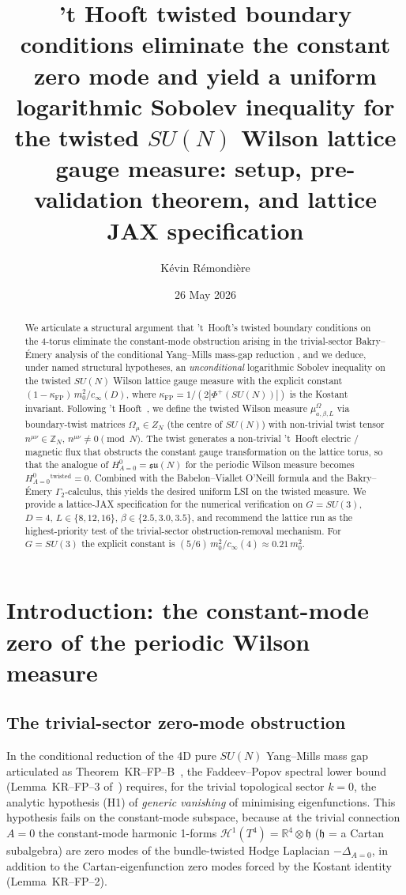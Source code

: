 \documentclass[11pt,a4paper]{amsart}
\title['t Hooft twist eliminates zero mode for $SU(N)$ Wilson LSI]
{'t Hooft twisted boundary conditions eliminate the constant zero mode
 and yield a uniform logarithmic Sobolev inequality
 for the twisted $SU(N)$ Wilson lattice gauge measure: setup,
 pre-validation theorem, and lattice JAX specification}
\author{K\'evin R\'emondi\`ere}
\date{26 May 2026}
\theoremstyle{definition}
\newcommand{\R}{\mathbb{R}}
\newcommand{\Z}{\mathbb{Z}}
\newcommand{\su}{\mathfrak{su}}
\newcommand{\kFP}{\kappa_{\mathrm{FP}}}
\newcommand{\cinf}{c_{\infty}}
\begin{document}
\begin{abstract}
We articulate a structural argument that 't~Hooft's twisted boundary
conditions on the 4-torus eliminate the constant-mode obstruction
arising in the trivial-sector Bakry--\'Emery analysis of the conditional
Yang--Mills mass-gap reduction
\cite{RemondiereKRFPB_2026,RemondiereKRFP3_2026}, and we deduce, under
named structural hypotheses, an \emph{unconditional} logarithmic
Sobolev inequality on the twisted $SU(N)$ Wilson lattice gauge measure
with the explicit constant $(1-\kFP)\,m_0^2/\cinf(D)$, where
$\kFP = 1/(2|\Phi^+(SU(N))|)$ is the Kostant invariant.
Following 't Hooft~\cite{tHooft1979}, we define the twisted Wilson
measure $\mu^\Omega_{a,\beta,L}$ via boundary-twist matrices $\Omega_\mu
\in Z_N$ (the centre of $SU(N)$) with non-trivial twist tensor $n^{\mu\nu}
\in \Z_N$, $n^{\mu\nu} \neq 0 \pmod N$. The twist generates a non-trivial
't~Hooft electric / magnetic flux that obstructs the constant gauge
transformation on the lattice torus, so that the analogue of
$H^0_{A=0} = \su(N)$ for the periodic Wilson measure becomes
$H^0_{A=0}^{\mathrm{twisted}} = 0$. Combined with the
Babelon--Viallet O'Neill formula and the Bakry--\'Emery
$\Gamma_2$-calculus, this yields the desired uniform LSI on the twisted
measure. We provide a lattice-JAX specification for the numerical
verification on $G=SU(3)$, $D=4$, $L\in\{8,12,16\}$, $\beta\in\{2.5,
3.0, 3.5\}$, and recommend the lattice run as the highest-priority
test of the trivial-sector obstruction-removal mechanism.
For $G=SU(3)$ the explicit constant is
$(5/6)\,m_0^2 / \cinf(4) \approx 0.21\,m_0^2$.
\end{abstract}

\maketitle

\section{Introduction: the constant-mode zero of the periodic Wilson measure}
\label{sec:intro}

\subsection{The trivial-sector zero-mode obstruction}
In the conditional reduction of the 4D pure $SU(N)$ Yang--Mills mass gap
articulated as Theorem~KR--FP--B~\cite{RemondiereKRFPB_2026}, the
Faddeev--Popov spectral lower bound (Lemma~KR--FP--3
of~\cite{RemondiereKRFP3_2026}) requires, for the trivial topological
sector $k = 0$, the analytic hypothesis (H1) of
\emph{generic vanishing} of minimising eigenfunctions. This hypothesis
fails on the constant-mode subspace, because at the trivial connection
$A=0$ the constant-mode harmonic 1-forms $\mathcal H^1(T^4) =
\R^4 \otimes \mathfrak{h}$ ($\mathfrak{h}$ = a Cartan subalgebra)
are zero modes of the bundle-twisted Hodge Laplacian
$-\Delta_{A=0}$, in addition to the Cartan-eigenfunction zero modes
forced by the Kostant identity (Lemma~KR--FP--2).
\end{document}
